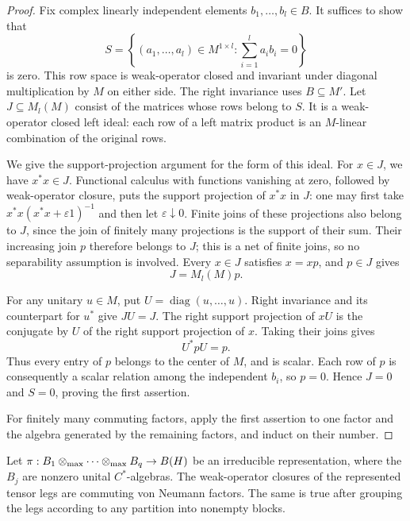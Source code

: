 \begin{proof}
Fix complex linearly independent elements \(b_1,\ldots,b_l\in B\).
It suffices to show that
\[
 S=\left\{(a_1,\ldots,a_l)\in M^{1\times l}:
                  \sum_{i=1}^l a_i b_i=0\right\}
\]
is zero. This row space is weak-operator closed and invariant under
diagonal multiplication by \(M\) on either side. The right invariance
uses \(B\subseteq M'\). Let \(J\subseteq M_l(M)\) consist of the matrices
whose rows belong to \(S\). It is a weak-operator closed left ideal:
each row of a left matrix product is an \(M\)-linear combination of the
original rows.

We give the support-projection argument for the form of this ideal.
For \(x\in J\), we have \(x^*x\in J\). Functional calculus with functions
vanishing at zero, followed by weak-operator closure, puts the support
projection of \(x^*x\) in \(J\): one may first take
\(x^*x(x^*x+\varepsilon1)^{-1}\) and then let
\(\varepsilon\downarrow0\). Finite joins of these projections also
belong to \(J\), since the join of finitely many projections is the
support of their sum. Their increasing join \(p\) therefore belongs to
\(J\); this is a net of finite joins, so no separability assumption is
involved. Every \(x\in J\) satisfies \(x=xp\), and \(p\in J\) gives
\[
                         J=M_l(M)p.
\]

For any unitary \(u\in M\), put \(U=\operatorname{diag}(u,\ldots,u)\).
Right invariance and its counterpart for \(u^*\) give \(JU=J\).
The right support projection of \(xU\) is the conjugate by \(U\) of the
right support projection of \(x\). Taking their joins gives
\[
                             U^*pU=p.
\]
Thus every entry of \(p\) belongs to the center of \(M\), and is scalar.
Each row of \(p\) is consequently a scalar relation among the independent
\(b_i\), so \(p=0\). Hence \(J=0\) and \(S=0\), proving the first assertion.

For finitely many commuting factors, apply the first assertion to one
factor and the algebra generated by the remaining factors, and induct
on their number.
\end{proof}

\begin{lemma}
\label{lem:tensor-grouped-factors}
Let \(\pi:B_1\otimes_{\max}\cdots\otimes_{\max} B_q\to B(H)\) be an irreducible
representation, where the \(B_j\) are nonzero unital
\(C^*\)-algebras. The weak-operator closures of the represented tensor
legs are commuting von Neumann factors. The same is true after grouping
the legs according to any partition into nonempty blocks.
\end{lemma}

